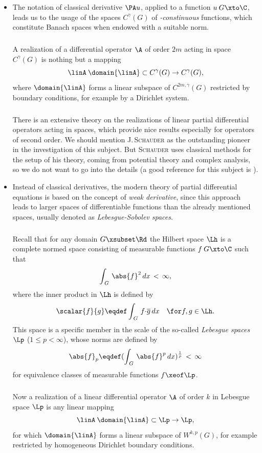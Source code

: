 \documentclass[11pt,twoside]{article}
\def\G{G}
\begin{document}
\begin{itemize}[leftmargin=4mm]
\item[1.] %
The notation of classical derivative $\PA u$,
applied to a function $u \: \G \xto \C$,
leads us to the usage
of the spaces $C^{\gamma}(\G)$ of \textit{{\HOELDER}-constinuous} functions,
which constitute Banach spaces when endowed with a suitable norm.

\subparagraph{}
A realization of a differential operator $\A$ of order $2m$
acting in {\HOELDER} space $C^{\gamma}(\G)$ is nothing but a mapping
\[ 
\linA \: \domain{\linA} \subset C^{\gamma}(\G) \to C^{\gamma}(\G),
\]
where $\domain{\linA}$ forms a linear subspace of $C^{2m,\gamma}(\G)$
restricted by boundary conditions,
for example by a Dirichlet system.

\subparagraph{}
There is an extensive theory on the realizations
of linear partial differential operators acting in {\HOELDER} spaces,
which provide nice results especially for operators of second order.
We should mention \textsc{J.\,Schauder} as the outstanding pioneer
in the investigation of this subject.
But \textsc{Schauder} uses classical methods for the setup of his theory,
coming from potential theory and complex analysis,
so we do not want to go into the details
(a good reference for this subject is \cite{XII_GT}).

\item[2.] %
Instead of classical derivatives,
the modern theory of partial differential equations
is based on the concept of \textit{weak derivative},
since this approach leads to larger spaces of differentiable functions
than the already mentioned {\HOELDER} spaces,
usually denoted as \textit{Lebesgue-Sobolev spaces}.

\subparagraph{} %
Recall that
for any domain $\G \xsubset \Rd$
the Hilbert space $\Lh$ is a complete normed space
consisting of measurable functions $f \: \G \xto \C$ such that
\[
\int_{\,\G} \, \abs{f} ^2 \, dx \, < \, \infty,
\]
where the inner product in $\Lh$ is defined by
\[
\scalar{f}{g} \eqdef \int_{\,\G} \, f {\cdot} \overline{g} \, dx
\quad \for f,g \in \Lh.
\]
This space is a specific member in the scale of the so-called
\textit{Lebesgue spaces} $\Lp$ ($1 \leq p < \infty$),
whose norms are defined by
\[
\abs{f} _p \eqdef ( \int_{\,\G} \, \abs{f} ^p \, dx)^{\frac{1}{p}} \,<\,\infty
\]
for equivalence classes of measurable functions $f \xeof \Lp$.

\subparagraph{}
Now a realization of a linear differential operator $\A$ of order $k$
in Lebesgue space $\Lp$ is any linear mapping
\[
\linA \: \domain{\linA} \subset \Lp \to \Lp,
\]
for which $\domain{\linA}$ forms a linear subspace of $W^{k,p}(\G)$,
for example restricted by homogeneous Dirichlet boundary conditions.
\end{itemize}
\end{document}
